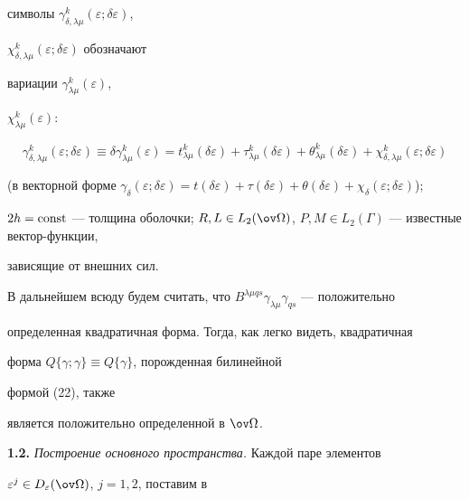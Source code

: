 символы $\gamma^k_{\delta,\lambda\mu}(\varepsilon; \delta\varepsilon)$, 


$\chi^k_{\delta,\lambda\mu}(\varepsilon;\delta\varepsilon)$ обозначают 


вариации $\gamma^k_{\lambda\mu}(\varepsilon)$, 


$\chi^k_{\lambda\mu}(\varepsilon)$: 


$$ 


\gamma^k_{\delta,\lambda\mu}(\varepsilon;\delta\varepsilon) 


\equiv \delta\gamma^k_{\lambda\mu}(\varepsilon)= 


t^k_{\lambda\mu}(\delta\varepsilon)+ 


\tau^k_{\lambda\mu}(\delta\varepsilon)+ 


\theta^k_{\lambda\mu}(\delta\varepsilon)+ 


\chi^k_{\delta,\lambda\mu}(\varepsilon;\delta\varepsilon) 


$$ 


(в векторной форме $\gamma_\delta(\varepsilon;\delta\varepsilon)= 


t(\delta\varepsilon)+ \tau(\delta\varepsilon)+ \theta(\delta\varepsilon)+ 


\chi_\delta(\varepsilon;\delta\varepsilon)$); 


$2h=\const$ --- толщина оболочки; $R,L\in L_2(\ov\Omega)$, $P,M\in 


L_2(\Gamma)$ --- известные вектор-функции, 


зависящие от внешних сил. 


 


В дальнейшем всюду будем считать, что $B^{\lambda\mu 


qs}\gamma_{\lambda\mu}\gamma_{qs}$ --- положительно 


определенная квадратичная форма. Тогда, как легко видеть, квадратичная 


форма $Q\{\gamma;\gamma\}\equiv Q\{\gamma\}$, порожденная билинейной 


формой (22), также 


является положительно определенной в $\ov\Omega$. 


\medskip 





 


{\bf 1.2.} {\it Построение основного пространства.} Каждой паре элементов 


$\varepsilon^j\in D_\varepsilon(\ov \Omega)$, $j=1,2$, поставим в 


